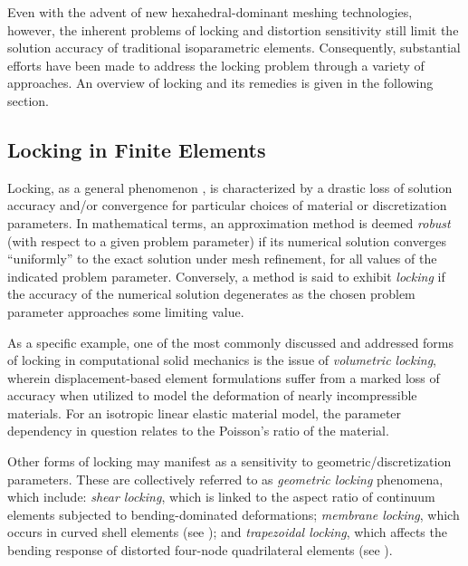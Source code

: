 	Even with the advent of new hexahedral-dominant meshing technologies, however, the inherent problems of locking and distortion sensitivity still limit the solution accuracy of traditional isoparametric elements. Consequently, substantial efforts have been made to address the locking problem through a variety of approaches. An overview of locking and its remedies is given in the following section.

	\subsection*{Locking in Finite Elements}
	
		Locking, as a general phenomenon \cite{Babuska&Suri:92:1}, is characterized by a drastic loss of solution accuracy and/or convergence for particular choices of material or discretization parameters. In mathematical terms, an approximation method is deemed \textit{robust} (with respect to a given problem parameter) if its numerical solution converges ``uniformly'' to the exact solution under mesh refinement, for all values of the indicated problem parameter. Conversely, a method is said to exhibit \textit{locking} if the accuracy of the numerical solution degenerates as the chosen problem parameter approaches some limiting value.
		
		As a specific example, one of the most commonly discussed and addressed forms of locking in computational solid mechanics is the issue of \textit{volumetric locking}, wherein displacement-based element formulations suffer from a marked loss of accuracy when utilized to model the deformation of nearly incompressible materials. For an isotropic linear elastic material model, the parameter dependency in question relates to the Poisson's ratio of the material.
		
		Other forms of locking may manifest as a sensitivity to geometric/discretization parameters. These are collectively referred to as \textit{geometric locking} phenomena, which include: \textit{shear locking}, which is linked to the aspect ratio of continuum elements subjected to bending-dominated deformations; \textit{membrane locking}, which occurs in curved shell elements (see \cite{Winkler:10}); and \textit{trapezoidal locking}, which affects the bending response of distorted four-node quadrilateral elements (see \cite{MacNeal:87}).
	
